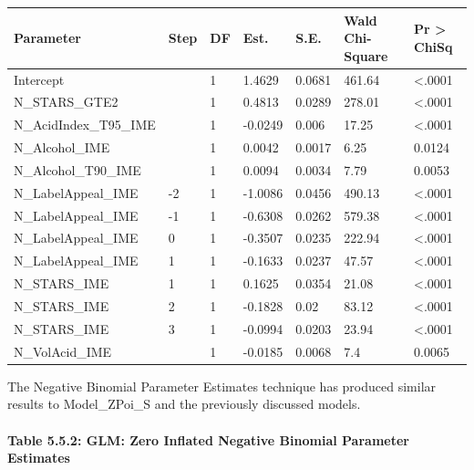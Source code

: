 \documentclass[]{article}
\let\oldparagraph\paragraph
\renewcommand{\paragraph}[1]{\oldparagraph{#1}\mbox{}}
\begin{document}
\begin{longtable}[]{@{}lllllll@{}}
\toprule
Parameter & Step & DF & Est. & S.E. & Wald Chi-Square & Pr
\textgreater{} ChiSq\tabularnewline
\midrule
\endhead
Intercept & & 1 & 1.4629 & 0.0681 & 461.64 &
\textless{}.0001\tabularnewline
N\_STARS\_GTE2 & & 1 & 0.4813 & 0.0289 & 278.01 &
\textless{}.0001\tabularnewline
N\_AcidIndex\_T95\_IME & & 1 & -0.0249 & 0.006 & 17.25 &
\textless{}.0001\tabularnewline
N\_Alcohol\_IME & & 1 & 0.0042 & 0.0017 & 6.25 & 0.0124\tabularnewline
N\_Alcohol\_T90\_IME & & 1 & 0.0094 & 0.0034 & 7.79 &
0.0053\tabularnewline
N\_LabelAppeal\_IME & -2 & 1 & -1.0086 & 0.0456 & 490.13 &
\textless{}.0001\tabularnewline
N\_LabelAppeal\_IME & -1 & 1 & -0.6308 & 0.0262 & 579.38 &
\textless{}.0001\tabularnewline
N\_LabelAppeal\_IME & 0 & 1 & -0.3507 & 0.0235 & 222.94 &
\textless{}.0001\tabularnewline
N\_LabelAppeal\_IME & 1 & 1 & -0.1633 & 0.0237 & 47.57 &
\textless{}.0001\tabularnewline
N\_STARS\_IME & 1 & 1 & 0.1625 & 0.0354 & 21.08 &
\textless{}.0001\tabularnewline
N\_STARS\_IME & 2 & 1 & -0.1828 & 0.02 & 83.12 &
\textless{}.0001\tabularnewline
N\_STARS\_IME & 3 & 1 & -0.0994 & 0.0203 & 23.94 &
\textless{}.0001\tabularnewline
N\_VolAcid\_IME & & 1 & -0.0185 & 0.0068 & 7.4 & 0.0065\tabularnewline
\bottomrule
\end{longtable}

The Negative Binomial Parameter Estimates technique has produced similar
results to Model\_ZPoi\_S and the previously discussed models.

\paragraph{Table 5.5.2: GLM: Zero Inflated Negative Binomial Parameter
Estimates}\label{table-5.5.2-glm-zero-inflated-negative-binomial-parameter-estimates}
\end{document}
